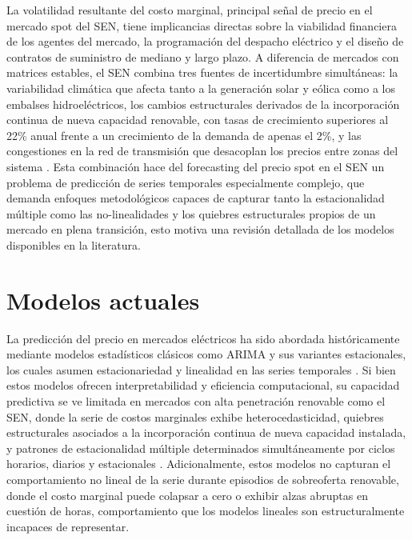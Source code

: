 La volatilidad resultante del costo marginal, principal señal de precio en el mercado spot del SEN, tiene implicancias directas sobre la viabilidad financiera de los agentes del mercado, la programación del despacho eléctrico y el diseño de contratos de suministro de mediano y largo plazo. A diferencia de mercados con matrices estables, el SEN combina tres fuentes de incertidumbre simultáneas: la variabilidad climática que afecta tanto a la generación solar y eólica como a los embalses hidroeléctricos, los cambios estructurales derivados de la incorporación continua de nueva capacidad renovable, con tasas de crecimiento superiores al 22\% anual frente a un crecimiento de la demanda de apenas el 2\%, y las congestiones en la red de transmisión que desacoplan los precios entre zonas del sistema \cite{Humphreys}. Esta combinación hace del forecasting del precio spot en el SEN un problema de predicción de series temporales especialmente complejo, que demanda enfoques metodológicos capaces de capturar tanto la estacionalidad múltiple como las no-linealidades y los quiebres estructurales propios de un mercado en plena transición, esto motiva una revisión detallada de los modelos disponibles en la literatura.

\section{Modelos actuales}

La predicción del precio en mercados eléctricos ha sido abordada históricamente mediante modelos estadísticos clásicos como ARIMA y sus variantes estacionales, los cuales asumen estacionariedad y linealidad en las series temporales \cite{weron}. Si bien estos modelos ofrecen interpretabilidad y eficiencia computacional, su capacidad predictiva se ve limitada en mercados con alta penetración renovable como el SEN, donde la serie de costos marginales exhibe heterocedasticidad, quiebres estructurales asociados a la incorporación continua de nueva capacidad instalada, y patrones de estacionalidad múltiple determinados simultáneamente por ciclos horarios, diarios y estacionales \cite{weron}. Adicionalmente, estos modelos no capturan el comportamiento no lineal de la serie durante episodios de sobreoferta renovable, donde el costo marginal puede colapsar a cero o exhibir alzas abruptas en cuestión de horas, comportamiento que los modelos lineales son estructuralmente incapaces de representar.

